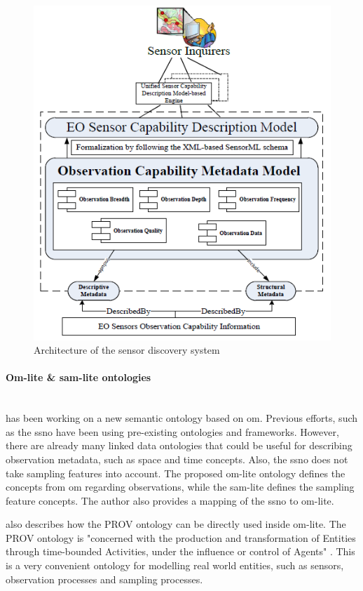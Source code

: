\begin{figure}
	\centering
	\includegraphics[width=0.8\linewidth]{figs/hu.png}
	\caption{Architecture of the sensor discovery system \cite[p. 10553]{SW:Hu}}
	\label{fig:Hu}
\end{figure}

\paragraph{Om-lite \& sam-lite ontologies} \mbox{}\\
\cite{SSW:Cox4} has been working on a new semantic ontology based on \ac{om}. Previous efforts, such as the \ac{ssno} have been using pre-existing ontologies and frameworks. However, there are already many linked data ontologies that could be useful for describing observation metadata, such as space and time concepts. Also, the \ac{ssno} does not take sampling features into account. The proposed om-lite ontology defines the concepts from \ac{om} regarding observations, while the sam-lite defines the sampling feature concepts. The author also provides a mapping of the \ac{ssno} to om-lite.

\cite{SSW:Cox4} also describes how the PROV ontology \citep{LD:PROV} can be directly used inside om-lite. The PROV ontology is "concerned with the production and transformation of Entities through time-bounded Activities, under the influence or control of Agents" \cite[p. 12]{SSW:Cox3}. This is a very convenient ontology for modelling real world entities, such as sensors, observation processes and sampling processes.  
 
